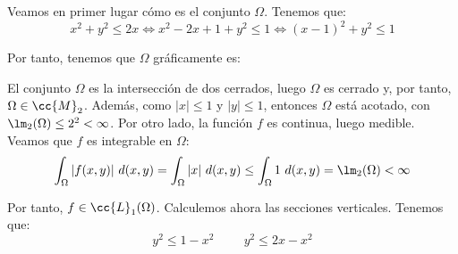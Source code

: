 \begin{ejercicio}
\begin{enumerate}
        Veamos en primer lugar cómo es el conjunto $\Omega$. Tenemos que:
        \begin{equation*}
            x^2 + y^2 \leq 2x \iff
            x^2 - 2x + 1 + y^2 \leq 1 \iff
            (x-1)^2 + y^2 \leq 1
        \end{equation*}

        Por tanto, tenemos que $\Omega$ gráficamente es:
        \begin{figure}[H]
            \centering
        \end{figure}

        El conjunto $\Omega$ es la intersección de dos cerrados, luego $\Omega$ es cerrado y, por tanto, $\Omega\in \cc{M}_2$.
        Además, como $|x|\leq 1$ y $|y|\leq 1$, entonces $\Omega$ está acotado, con $\lm_2(\Omega)\leq 2^2 < \infty$.
        Por otro lado, la función $f$ es continua, luego medible. Veamos que $f$ es integrable en $\Omega$:
        \begin{equation*}
            \int_{\Omega} |f(x, y)|~d(x, y)
            = \int_{\Omega} |x|~d(x, y) \leq \int_{\Omega} 1~d(x, y) = \lm_2(\Omega) < \infty
        \end{equation*}

        Por tanto, $f\in \cc{L}_1(\Omega)$. Calculemos ahora las secciones verticales.
        Tenemos que:
        \begin{equation*}
            y^2\leq 1-x^2 \hspace{1cm} y^2\leq 2x-x^2
        \end{equation*}


\end{enumerate}
\end{ejercicio}
